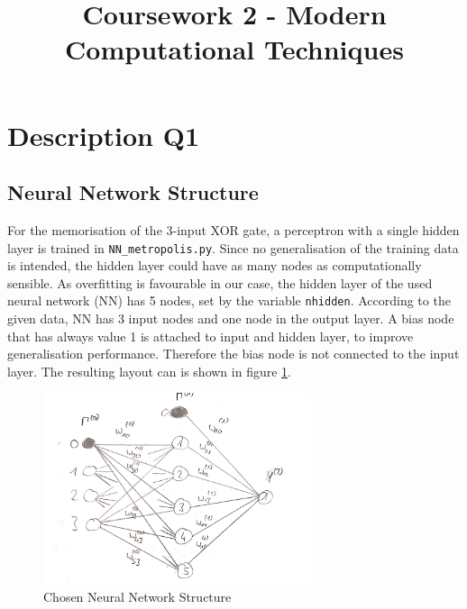 \documentclass[11pt,a4paper]{article}
\title{Coursework 2 - Modern Computational Techniques \vspace{-1.5cm}}
\date{}
\begin{document}
\maketitle
\newcommand{\num}{\thenum \stepcounter{num} }
\newcommand{\aufgabe}[1]{\subsection*{Aufgabe A\thesubsection: #1}
    \stepcounter{subsection}}
\setcounter{subsection}{1}
\newcommand{\enumalph}{\renewcommand{\theenumi}{\alph{enumi}}}

\section*{Description Q1 }
\subsection*{Neural Network Structure}
For the memorisation of the 3-input XOR gate, a perceptron with a single hidden
layer is trained in \texttt{NN\_metropolis.py}. Since no generalisation of the
training data is intended, the hidden layer could have as many nodes as
computationally sensible. As overfitting is favourable in our case,
the hidden layer of the used neural network (NN) has 5 nodes, set by the
variable
\texttt{nhidden}. According to the given data, NN has 3 input nodes and
one node in the output layer. A bias node that has always value 1 is attached
to input and hidden layer, to improve generalisation performance. Therefore
the bias node is not connected to the input layer. The resulting layout can
is shown in figure \ref{fig:struct}.

\begin{figure}[h]
    \centering
    \includegraphics[width=0.7\textwidth]{NN.png}
    \caption{Chosen Neural Network Structure}
    \label{fig:struct}
\end{figure}
\end{document}
